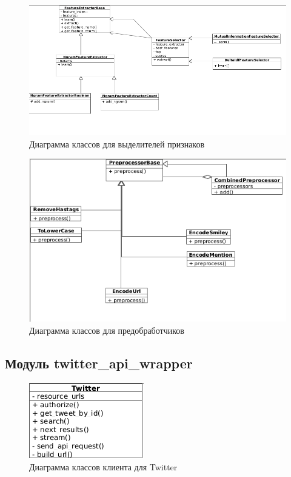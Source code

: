 \begin{figure}[!Ht]
\begin{center}
\includegraphics[scale=0.5, trim=0mm 0mm 0mm 1.5mm, clip]{../resources/uml/diag2.png}
\caption{Диаграмма классов для выделителей признаков}
\label{gr:extractors}
\end{center}
\end{figure} 

\begin{figure}[!Ht]
\begin{center}
\includegraphics[scale=0.6, trim=1.2mm 10mm 0mm 1mm, clip]{../resources/uml/diag3.png}
\caption{Диаграмма классов для предобработчиков}
\label{gr:preprocessors}
\end{center}
\end{figure} 

\clearpage{}

\subsection{Модуль twitter\_api\_wrapper}
\begin{figure}[!ht]
\begin{center}
\includegraphics[scale=0.4, trim=0mm 0mm 0mm 0mm, clip]{../resources/uml/diag4.png}
\caption{Диаграмма классов клиента для Twitter}
\label{gr:preprocessors}
\end{center}
\end{figure} 

